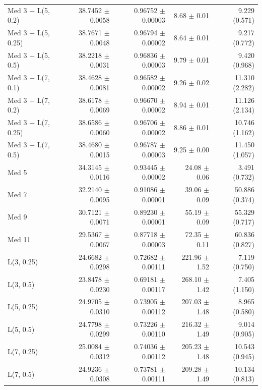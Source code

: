 \begin{longtable}{lrrrr}
Med 3 + L(5, 0.2) & 38.7452 $\pm$ 0.0058 & 0.96752 $\pm$ 0.00003 & 8.68 $\pm$ 0.01 & 9.229 (0.571) \\
Med 3 + L(5, 0.25) & 38.7671 $\pm$ 0.0048 & 0.96794 $\pm$ 0.00002 & 8.64 $\pm$ 0.01 & 9.217 (0.772) \\
Med 3 + L(5, 0.5) & 38.2218 $\pm$ 0.0031 & 0.96836 $\pm$ 0.00003 & 9.79 $\pm$ 0.01 & 9.420 (0.968) \\
Med 3 + L(7, 0.1) & 38.4628 $\pm$ 0.0081 & 0.96582 $\pm$ 0.00002 & 9.26 $\pm$ 0.02 & 11.310 (2.282) \\
Med 3 + L(7, 0.2) & 38.6178 $\pm$ 0.0069 & 0.96670 $\pm$ 0.00002 & 8.94 $\pm$ 0.01 & 11.126 (2.134) \\
Med 3 + L(7, 0.25) & 38.6586 $\pm$ 0.0060 & 0.96706 $\pm$ 0.00002 & 8.86 $\pm$ 0.01 & 10.746 (1.162) \\
Med 3 + L(7, 0.5) & 38.4680 $\pm$ 0.0015 & 0.96787 $\pm$ 0.00003 & 9.25 $\pm$ 0.00 & 11.450 (1.057) \\
Med 5 & 34.3145 $\pm$ 0.0116 & 0.93445 $\pm$ 0.00002 & 24.08 $\pm$ 0.06 & 3.491 (0.732) \\
Med 7 & 32.2140 $\pm$ 0.0095 & 0.91086 $\pm$ 0.00001 & 39.06 $\pm$ 0.09 & 50.886 (0.374) \\
Med 9 & 30.7121 $\pm$ 0.0071 & 0.89230 $\pm$ 0.00001 & 55.19 $\pm$ 0.09 & 55.329 (0.717) \\
Med 11 & 29.5367 $\pm$ 0.0067 & 0.87718 $\pm$ 0.00003 & 72.35 $\pm$ 0.11 & 60.836 (0.827) \\
L(3, 0.25) & 24.6682 $\pm$ 0.0298 & 0.72682 $\pm$ 0.00111 & 221.96 $\pm$ 1.52 & 7.119 (0.750) \\
L(3, 0.5) & 23.8478 $\pm$ 0.0230 & 0.69181 $\pm$ 0.00117 & 268.10 $\pm$ 1.42 & 7.405 (1.150) \\
L(5, 0.25) & 24.9705 $\pm$ 0.0310 & 0.73905 $\pm$ 0.00112 & 207.03 $\pm$ 1.48 & 8.965 (0.580) \\
L(5, 0.5) & 24.7798 $\pm$ 0.0299 & 0.73226 $\pm$ 0.00110 & 216.32 $\pm$ 1.49 & 9.014 (0.905) \\
L(7, 0.25) & 25.0084 $\pm$ 0.0312 & 0.74036 $\pm$ 0.00112 & 205.23 $\pm$ 1.48 & 10.543 (0.945) \\
L(7, 0.5) & 24.9236 $\pm$ 0.0308 & 0.73781 $\pm$ 0.00111 & 209.28 $\pm$ 1.49 & 10.134 (0.813) \\
\end{longtable}
\endgroup
